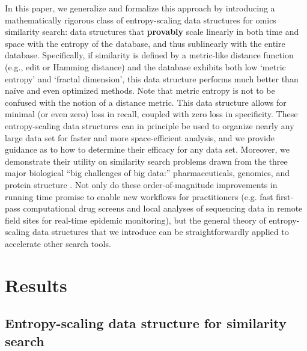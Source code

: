 \documentclass[review,preprint,12pt]{elsarticle}
\renewcommand{\cite}{\citep} %
\theoremstyle{definition}
\theoremstyle{remark}
\numberwithin{equation}{section}
\begin{document}
In this paper, we generalize and formalize this approach by introducing 
a mathematically rigorous class of entropy-scaling data structures for 
omics similarity search: data structures that \textbf{provably} scale linearly in both time and space with the entropy of the database, and thus sublinearly with the entire database.
Specifically, if similarity is defined by a metric-like distance function (e.g., edit or Hamming distance) and the database exhibits both low `metric entropy' and `fractal dimension', this data structure performs much better than na\"ive and even optimized methods.
Note that metric entropy is not to be confused with the notion of a distance metric.
This data structure allows for minimal (or even zero) loss in recall, coupled
with zero loss in specificity.
These entropy-scaling data structures can in principle be used to organize nearly any large data set for faster and more space-efficient analysis,
and we provide guidance as to how to determine their efficacy for any data set.
Moreover, we demonstrate their utility on similarity search problems drawn from the three major biological ``big challenges of big data:'' pharmaceuticals, genomics, and protein structure \cite{marx2013biology}.
Not only do these order-of-magnitude improvements in running time promise to enable new workflows for practitioners (e.g. fast first-pass computational drug screens and local analyses of sequencing data in remote field sites for real-time epidemic monitoring), but the general theory of entropy-scaling data structures that we introduce can be straightforwardly applied to accelerate other search tools.

\section{Results}

\subsection{Entropy-scaling data structure for similarity search}
\end{document}
